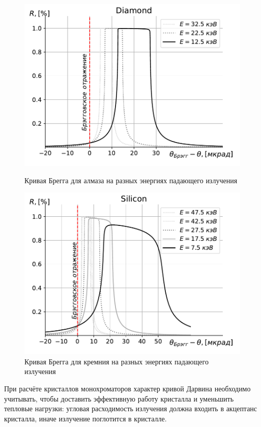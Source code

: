 \begin{figure}
	\centering  
	\begin{minipage}{0.49\textwidth}
		\centering
		\includegraphics[width=\textwidth]{pic/Diamond_bragg_R.pdf}
		\caption{Кривая Брегга для алмаза на разных энергиях падающего излучения}
		\label{fig:bragg_R}
	\end{minipage}\hfill
	\begin{minipage}{0.49\textwidth}
		\centering
		\includegraphics[width=\textwidth]{pic/Silicon_bragg_R.pdf}
		\caption{Кривая Брегга для кремния на разных энергиях падающего излучения}
		\label{fig:bragg_T}
	\end{minipage}    
\end{figure}
При расчёте кристаллов монохроматоров характер кривой Дарвина необходимо учитывать, чтобы доставить эффективную работу кристалла и уменьшить тепловые нагрузки: угловая расходимость излучения должна входить в акцептанс кристалла, иначе излучение поглотится в кристалле. 


